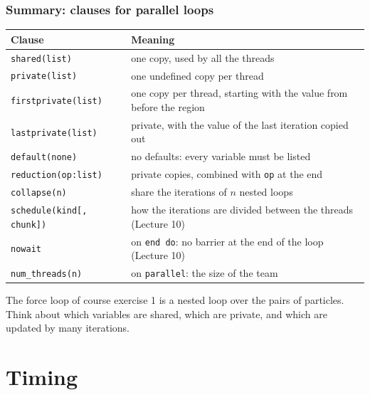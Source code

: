 \begin{frame}[fragile]
  \frametitle{Summary: clauses for parallel loops}
  \centering
  \small
  \begin{tabular}{ll}
    \textbf{Clause} & \textbf{Meaning} \\
    \hline
    \texttt{shared(list)}             & one copy, used by all the threads \\
    \texttt{private(list)}            & one undefined copy per thread \\
    \texttt{firstprivate(list)}       & one copy per thread, starting with the value from before the region \\
    \texttt{lastprivate(list)}        & private, with the value of the last iteration copied out \\
    \texttt{default(none)}            & no defaults: every variable must be listed \\
    \texttt{reduction(op:list)}       & private copies, combined with \texttt{op} at the end \\
    \texttt{collapse(n)}              & share the iterations of $n$ nested loops \\
    \texttt{schedule(kind[, chunk])}  & how the iterations are divided between the threads (Lecture 10) \\
    \texttt{nowait}                   & on \texttt{end do}: no barrier at the end of the loop (Lecture 10) \\
    \texttt{num\_threads(n)}          & on \texttt{parallel}: the size of the team \\
    \hline
  \end{tabular}

  \vspace*{5mm}
  \raggedright
  \normalsize
  The force loop of course exercise 1 is a nested loop over the pairs of particles. Think about which variables are shared, which are private, and which are updated by many iterations.
\end{frame}


\section{Timing}

